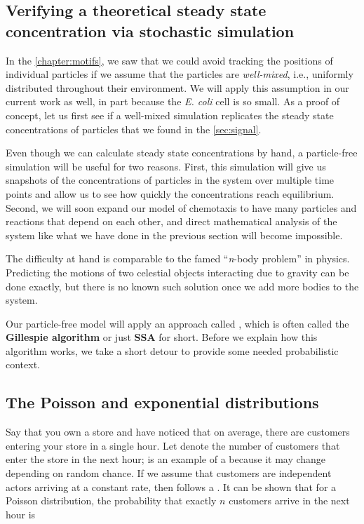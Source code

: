 \subsection{Verifying a theoretical steady state concentration via stochastic simulation}

In the \autoref{chapter:motifs}, we saw that we could avoid tracking the positions of individual particles if we assume that the particles are \textit{well-mixed}, i.e., uniformly distributed throughout their environment. We will apply this assumption in our current work as well, in part because the \textit{E. coli} cell is so small. As a proof of concept, let us first see if a well-mixed simulation replicates the steady state concentrations of particles that we found in the \autoref{sec:signal}.

Even though we can calculate steady state concentrations by hand, a particle-free simulation will be useful for two reasons. First, this simulation will give us snapshots of the concentrations of particles in the system over multiple time points and allow us to see how quickly the concentrations reach equilibrium. Second, we will soon expand our model of chemotaxis to have many particles and reactions that depend on each other, and direct mathematical analysis of the system like what we have done in the previous section will become impossible.

The difficulty at hand is comparable to the famed ``\textit{n}-body problem'' in physics. Predicting the motions of two celestial objects interacting due to gravity can be done exactly, but there is no known such solution once we add more bodies to the system.

Our particle-free model will apply an approach called , which is often called the \textbf{Gillespie algorithm} or just \textbf{SSA} for short. Before we explain how this algorithm works, we take a short detour to provide some needed probabilistic context.

\FloatBarrier
{}
\subsection{The Poisson and exponential distributions}

Say that you own a store and have noticed that on average, there are  customers entering your store in a single hour. Let  denote the number of customers that enter the store in the next hour;  is an example of a  because it may change depending on random chance. If we assume that customers are independent actors arriving at a constant rate, then  follows a . It can be shown that for a Poisson distribution, the probability that exactly $n$ customers arrive in the next hour is

